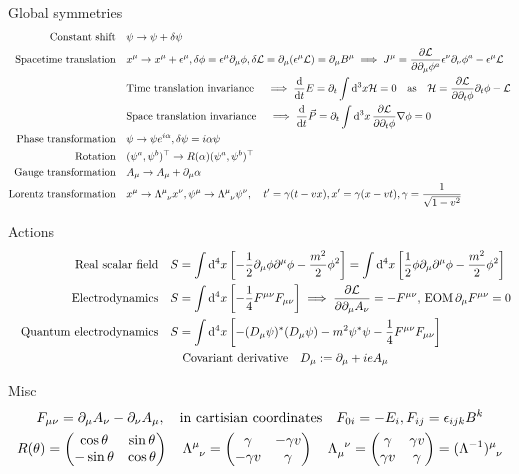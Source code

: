 \documentclass[main]{subfiles}
\begin{document}
Global symmetries
\begin{align}
    \text{Constant shift}& \quad \psi \ra \psi + \delta \psi\\
    \text{Spacetime translation}& \quad x^{\mu} \ra x^{\mu} + \epsilon^{\mu}, \delta \phi = \epsilon^{\mu}\partial_\mu\phi, \delta\La = \partial_\mu(\epsilon^{\mu}\La) = \partial_\mu B^{\mu} \implies J^\mu = \pdv{\La}{\partial_{\mu}\phi^{a}}\epsilon^{\nu}\partial_{\nu}\phi^a - \epsilon^{\mu}\La\\
    & \qq{Time translation invariance} \implies \dv{}{t}E = \partial_t\int\dd[3]x\mathcal{H} = 0 \qas \mathcal{H} = \pdv{\mathcal{L}}{\partial_t\phi}\partial_t\phi - \mathcal{L}\\
    & \qq{Space translation invariance} \implies \dv{}{t}\vec P = \partial_t\int \dd[3]{x} \pdv{\mathcal{L}}{\partial_t\phi}\nabla\phi = 0\\
    \text{Phase transformation}& \quad \psi \ra \psi e^{i\alpha}, \delta\psi = i\alpha\psi\\
    \text{Rotation}& \quad (\psi^a, \psi^b)^\top \ra R(\alpha)(\psi^a, \psi^b)^\top\\
    \text{Gauge transformation}& \quad A_\mu \ra A_\mu + \partial_\mu \alpha\\
    \text{Lorentz transformation}& \quad x^\mu \ra \Lambda\indices{^\mu_\nu} x^\nu, \psi^\mu \ra \Lambda\indices{^\mu_\nu} \psi^\nu, \quad t'=\gamma(t-vx), x' = \gamma(x-vt), \gamma=\frac{ 1}{\sqrt{1-v^2}}
\end{align}

Actions
\begin{align}
    \qq{Real scalar field} &
    S = \int\dd[4]{x} \qty[-\frac{ 1}{2}\partial_\mu\phi\partial^{\mu}\phi - \frac{m^2}{2}\phi^2] = \int\dd[4]{x} \qty[\frac{ 1}{2}\phi\partial_\mu\partial^{\mu}\phi - \frac{m^2}{2}\phi^2]\label{eq:real-scalar-field}\\
    \qq{Electrodynamics} &
    S = \int\dd[4]{x} \qty[-\frac{1}{4}F^{\mu\nu}F_{\mu\nu}] \implies \pdv{\La}{\partial_\mu A_\nu} = -F^{\mu\nu},\,\text{EOM}\, \partial_\mu F^{\mu\nu} = 0\\
    \qq{Quantum electrodynamics} &
    S = \int\dd[4]{x} \qty[-(D_{\mu }\psi )^*(D_{\mu }\psi ) - m^2 \psi ^*\psi - \frac{1}{4}F^{\mu \nu }F_{\mu \nu }]\\
    & \qq{Covariant derivative} D_{\mu } := \partial_{\mu } + ieA_{\mu }
\end{align}

Misc
\begin{gather}
    F_{\mu\nu} = \partial_\mu A_\nu - \partial_{\nu}A_\mu,\qq{in cartisian coordinates} F_{0i} = -E_i, F_{ij} = \epsilon_{ijk}B^{k}\\
    R(\theta) = \mqty(\cos\theta & \sin\theta \\ -\sin\theta & \cos\theta)\,\quad \Lambda\indices{^{\mu}_\nu} = \mqty(\gamma & -\gamma v \\ -\gamma v & \gamma)\,\quad
    \Lambda\indices{_{\mu}^\nu} = \mqty(\gamma & \gamma v \\ \gamma v & \gamma) = (\Lambda^{-1})\indices{^{\mu}_\nu}
\end{gather}
\end{document}
